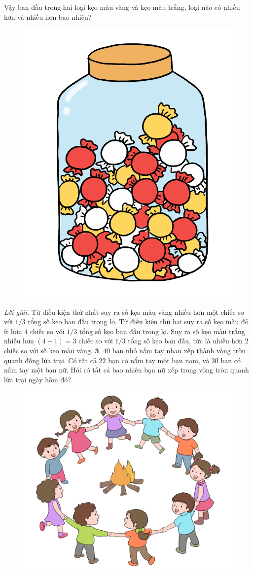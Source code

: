 \begin{multicols}{2}
	\vskip 0.1cm
	Vậy ban đầu trong hai loại kẹo màu vàng và kẹo màu trắng, loại nào có nhiều hơn và nhiều hơn bao nhiêu?
	\begin{figure}[H]
		\centering
		\vspace*{-10pt}
		\captionsetup{labelformat= empty, justification=centering}
		\includegraphics[width=0.45\linewidth]{Pi12_Bai2}
		\vspace*{-15pt}
	\end{figure}
	\textit{Lời giải.} 	Từ điều kiện thứ nhất suy ra số kẹo màu vàng nhiều hơn một chiếc so với $1/3$ tổng số kẹo ban đầu trong lọ. Từ điều kiện thứ hai suy ra số kẹo màu đỏ ít hơn $4$ chiếc so với $1/3$ tổng số kẹo ban đầu trong lọ. Suy ra số kẹo màu trắng  nhiều hơn $(4-1)=3$ chiếc so với $1/3$ tổng số kẹo ban đầu, tức là nhiều hơn $2$ chiếc so với số kẹo màu vàng.
	\vskip 0.1cm
	$\pmb{3.}$ $40$ bạn nhỏ nắm tay nhau xếp thành vòng tròn quanh đống lửa trại. Có tất cả $22$ bạn có nắm tay một bạn nam, và $30$ bạn có nắm tay một bạn nữ. Hỏi có tất cả bao nhiêu bạn nữ xếp trong vòng tròn quanh lửa trại ngày hôm đó?
	\begin{figure}[H]
		\centering
		\vspace*{-10pt}
		\captionsetup{labelformat= empty, justification=centering}
		\includegraphics[width=0.9\linewidth]{Pi12_Bai3}

\end{figure}
\end{multicols}
